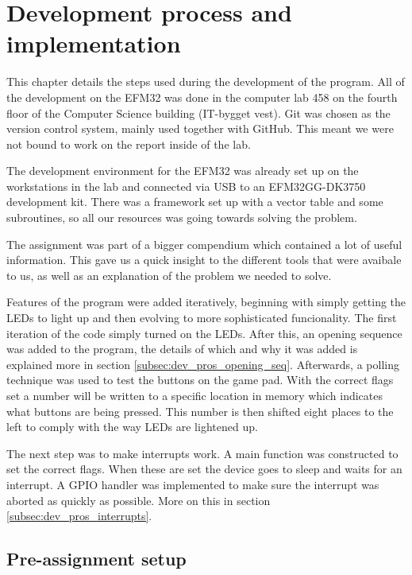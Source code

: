 \section{Development process and implementation}
\label{chap:development_process}

This chapter details the steps used during the development of the program. All of the development on the EFM32 was done in the computer lab 458 on the fourth floor of the Computer Science building (IT-bygget vest). Git was chosen as the version control system, mainly used together with GitHub. This meant we were not bound to work on the report inside of the lab.

The development environment for the EFM32 was already set up on the workstations in the lab and connected via USB to an EFM32GG-DK3750 development kit. There was a framework set up with a vector table and some subroutines, so all our resources was going towards solving the problem.

The assignment was part of a bigger compendium \cite{eeds-compendium} which contained a lot of useful information. This gave us a quick insight to the different tools that were avaibale to us, as well as an explanation of the problem we needed to solve.

Features of the program were added iteratively, beginning with simply getting the LEDs to light up and then evolving to more sophisticated funcionality. The first iteration of the code simply turned on the LEDs. After this, an opening sequence was added to the program, the details of which and why it was added is explained more in section \ref{subsec:dev_pros_opening_seq}. Afterwards, a polling technique was used to test the buttons on the game pad. With the correct flags set a number will be written to a specific location in memory which indicates what buttons are being pressed. This number is then shifted eight places to the left to comply with the way LEDs are lightened up.

The next step was to make interrupts work. A main function was constructed to set the correct flags. When these are set the device goes to sleep and waits for an interrupt. A GPIO handler was implemented to make sure the interrupt was aborted as quickly as possible. More on this in section \ref{subsec:dev_pros_interrupts}.

\subsection{Pre-assignment setup}
\label{subsec:pre-assingment_setup}

